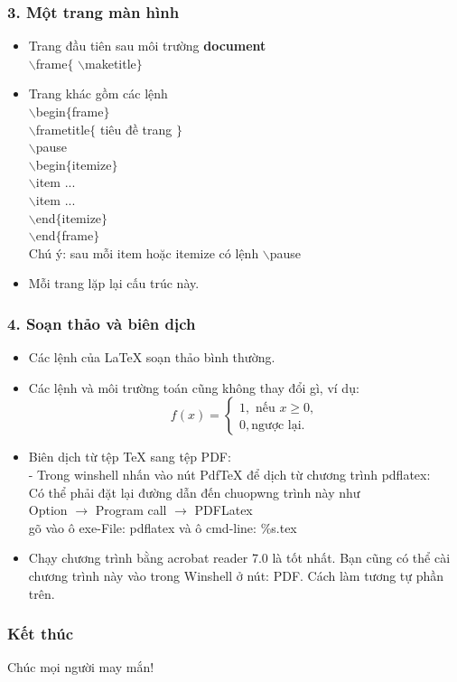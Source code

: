 \documentclass[10pt]{beamer}
\begin{document}
\begin{frame}  
\frametitle{3. Một trang màn hình}
\pause
\begin{itemize}
\item Trang đầu tiên sau môi trường {\bf document}\\
$\backslash$frame$\{$ $\backslash$maketitle$\}$
\pause
\item Trang khác gồm các lệnh\\
$\backslash$begin$\{$frame$\}$\\  
$\backslash$frametitle$\{$ tiêu đề trang $\}$\\
$\backslash$pause\\
$\backslash$begin$\{$itemize$\}$\\
$\backslash$item ...\\
$\backslash$item ...\\
 $\backslash$end$\{$itemize$\}$\\
 $\backslash$end$\{$frame$\}$  \\
 Chú ý: sau mỗi item hoặc itemize có lệnh  $\backslash$pause
\pause 
 \item Mỗi trang lặp lại cấu trúc này.
  \end{itemize}
\end{frame}
 
\begin{frame}  
\frametitle{4. Soạn thảo và biên dịch}
\pause
\begin{itemize}
\item Các lệnh của \LaTeX{} soạn thảo bình thường.
\pause
\item Các lệnh và môi trường toán cũng không thay đổi gì, ví dụ:
\begin{equation}
f(x)=\begin{cases}
1, \mbox{ nếu }x\ge 0,\\
0, \mbox{ngược lại.}
\end{cases}
\end{equation}
\pause 
 \item Biên dịch từ tệp TeX sang tệp PDF:\\
 - Trong winshell nhấn vào nút PdfTeX  để dịch từ chương trình pdflatex:\\
 Có thể phải đặt lại đường dẫn đến chuopwng trình này như\\
 Option $\rightarrow$ Program call $\rightarrow$ PDFLatex\\
 gõ vào ô exe-File: pdflatex và ô cmd-line: \%s.tex
 \pause 
 \item Chạy chương trình bằng acrobat reader 7.0 là tốt nhất. Bạn cũng có thể cài chương trình này vào trong Winshell ở nút: PDF. Cách làm tương tự phần trên.
  \end{itemize}
\end{frame}

\begin{frame}  
\frametitle{Kết thúc}
\begin{center}
Chúc mọi người may mắn!
\end{center}
\end{frame} 
\end{document}
